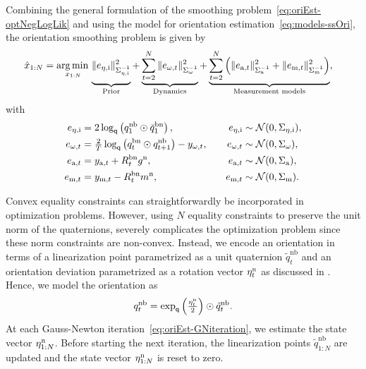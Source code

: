 Combining the general formulation of the smoothing problem~\eqref{eq:oriEst-optNegLogLik} and using the model for orientation estimation~\eqref{eq:models-ssOri}, the orientation smoothing problem is given by 
\begin{align}
\label{eq:oriEst-oriSmoothing}
\hat{x}_{1:N} = \argmin_{x_{1:N}} &\underbrace{\vphantom{\sum_{t = 2}^N} \| e_{\oriError,\text{i}} \|_{\Sigma_{\oriError,\text{i}}^{-1}}^2}_{\text{Prior}} + \underbrace{\sum_{t = 2}^N \| e_{\omega,t} \|_{\Sigma_\omega^{-1}}^2}_{\text{Dynamics}} + 
\underbrace{\sum_{t = 2}^N \left( \| e_{\text{a},t} \|_{\Sigma_\text{a}^{-1}}^2 + \| e_{\text{m},t} \|_{\Sigma_\text{m}^{-1}}^2\right)}_{\text{Measurement models}},
\end{align}
with
\begin{subequations}
\label{eq:oriEst-smoothingTerms}
\begin{align}
e_{\eta,\text{i}} &=  2 \log_\mathsf{q} \left( q_1^\text{nb} \odot \breve{q}_1^\text{bn} \right), \quad & e_{\eta,\text{i}} &\sim \mathcal{N}(0,\Sigma_{\eta,\text{i}}), \\
e_{\omega,t} &= \tfrac{2}{T} \log_\mathsf{q} \left( q_t^\text{bn} \odot q^\text{nb}_{t+1}\right) - y_{\omega,t}, \quad & e_{\omega,t} &\sim \mathcal{N}(0,\Sigma_\omega),  \\
e_{\text{a},t} &= y_{\text{a},t} + R^\text{bn}_t g^\text{n}, \quad & e_{\text{a},t} &\sim \mathcal{N}(0,\Sigma_\text{a}), \\
e_{\text{m},t} &= y_{\text{m},t} - R^\text{bn}_t m^\text{n}, \quad & e_{\text{m},t} &\sim \mathcal{N}(0,\Sigma_\text{m}). 
\end{align}
\end{subequations}

Convex equality constraints can straightforwardly be incorporated in optimization problems. However, using $N$ equality constraints to preserve the unit norm of the quaternions, severely complicates the optimization problem since these norm constraints are non-convex. Instead, we encode an orientation in terms of a linearization point parametrized as a unit quaternion $\tilde{q}^\text{nb}_t$ and an orientation deviation parametrized as a rotation vector $\eta_t^\text{n}$ as discussed in . Hence, we model the orientation as 
\begin{align}
q^\text{nb}_t = \exp_\mathsf{q} \left( \tfrac{\eta_t^\text{n}}{2} \right) \odot \tilde{q}^\text{nb}_t.
\label{eq:oriEst-linSmoothing}
\end{align}
At each Gauss-Newton iteration~\eqref{eq:oriEst-GNiteration}, we estimate the state vector $\eta_{1:N}^\text{n}$. Before starting the next iteration, the linearization points $\tilde{q}^\text{nb}_{1:N}$ are updated and the state vector $\eta_{1:N}^\text{n}$ is reset to zero.

